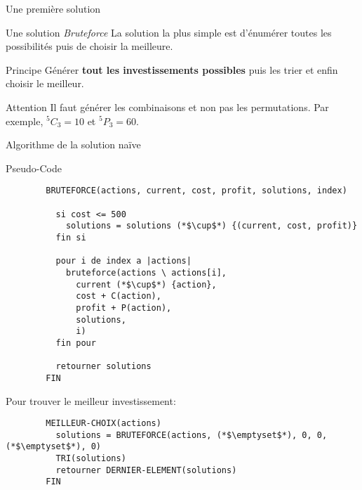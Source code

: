 \begin{frame}{Une première solution}

  \begin{block}{Une solution \textit{Bruteforce}}
    La solution la plus simple est d'énumérer toutes les possibilités
    puis de choisir la meilleure.
  \end{block}

  \begin{block}{Principe}
    Générer \textbf{tout les investissements possibles} puis les trier
    et enfin choisir le meilleur.
  \end{block}

  \begin{alertblock}{Attention}
    Il faut générer les combinaisons et non pas les permutations.
    Par exemple, $^{5}C_3 = 10$ et $^{5}P_3 = 60$.
  \end{alertblock}

\end{frame}


\begin{frame}[fragile]{Algorithme de la solution naïve}
  \begin{block}{Pseudo-Code}
    \tiny
    \begin{center}
      \begin{lstlisting}
        BRUTEFORCE(actions, current, cost, profit, solutions, index)

          si cost <= 500
            solutions = solutions (*$\cup$*) {(current, cost, profit)}
          fin si

          pour i de index a |actions|
            bruteforce(actions \ actions[i],
              current (*$\cup$*) {action},
              cost + C(action),
              profit + P(action),
              solutions,
              i)
          fin pour

          retourner solutions
        FIN
      \end{lstlisting}

      Pour trouver le meilleur investissement:

      \begin{lstlisting}
        MEILLEUR-CHOIX(actions)
          solutions = BRUTEFORCE(actions, (*$\emptyset$*), 0, 0, (*$\emptyset$*), 0)
          TRI(solutions)
          retourner DERNIER-ELEMENT(solutions)
        FIN
      \end{lstlisting}
    \end{center}
  \end{block}
\end{frame}

